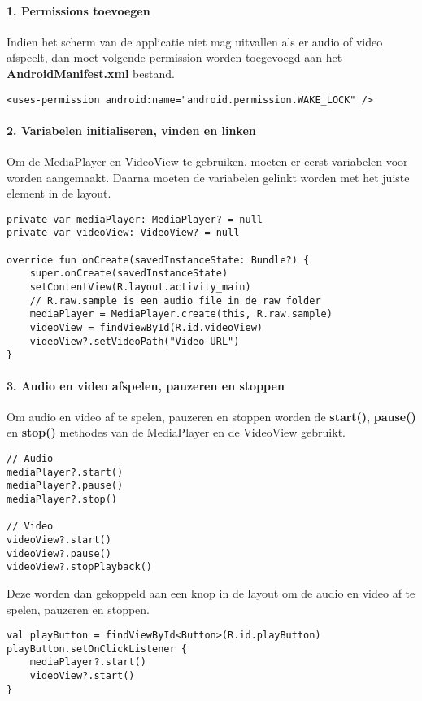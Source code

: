 \paragraph{1. Permissions toevoegen}
Indien het scherm van de applicatie niet mag uitvallen als er 
audio of video afspeelt, dan moet volgende permission worden toegevoegd aan het 
\textbf{AndroidManifest.xml} bestand.
\begin{verbatim}
<uses-permission android:name="android.permission.WAKE_LOCK" />
\end{verbatim}

\paragraph{2. Variabelen initialiseren, vinden en linken}
Om de MediaPlayer en VideoView te gebruiken, moeten er eerst variabelen voor 
worden aangemaakt. Daarna moeten de variabelen gelinkt worden met het juiste element in de layout.
\begin{verbatim}
private var mediaPlayer: MediaPlayer? = null
private var videoView: VideoView? = null

override fun onCreate(savedInstanceState: Bundle?) {
    super.onCreate(savedInstanceState)
    setContentView(R.layout.activity_main)
    // R.raw.sample is een audio file in de raw folder
    mediaPlayer = MediaPlayer.create(this, R.raw.sample)
    videoView = findViewById(R.id.videoView)
    videoView?.setVideoPath("Video URL")
}
\end{verbatim}

\paragraph{3. Audio en video afspelen, pauzeren en stoppen}
Om audio en video af te spelen, pauzeren en stoppen worden de 
\textbf{start()}, \textbf{pause()} en \textbf{stop()} methodes van de
MediaPlayer en de VideoView gebruikt.
\begin{verbatim}
// Audio
mediaPlayer?.start()
mediaPlayer?.pause()
mediaPlayer?.stop()

// Video
videoView?.start()
videoView?.pause()
videoView?.stopPlayback()
\end{verbatim}
Deze worden dan gekoppeld aan een knop in de layout om de audio en video
af te spelen, pauzeren en stoppen.
\begin{verbatim}
val playButton = findViewById<Button>(R.id.playButton)
playButton.setOnClickListener {
    mediaPlayer?.start()
    videoView?.start()
}
\end{verbatim}

